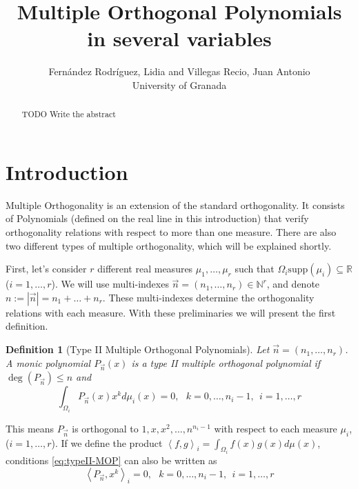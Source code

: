 \documentclass[12pt,a4]{article}
\theoremstyle{plain}
\newtheorem{definition}[theorem]{Definition}
\newcommand{\R}[0]{\mathbb{R}}
\newcommand{\N}[0]{\mathbb{N}}
\newcommand{\supp}[0]{\mathrm{supp}}
\newcommand{\cred}[1]{{\color{red} #1}}
\newcommand{\prodesc}[2]{\left\langle #1 , #2 \right\rangle}
\begin{document}
\title{Multiple Orthogonal Polynomials in several variables}


\author{Fernández Rodríguez, Lidia and Villegas Recio, Juan Antonio\\
\small University of Granada}
\maketitle

\begin{abstract}
\cred{TODO Write the abstract}
\end{abstract}

\section{Introduction}

Multiple Orthogonality is an extension of the standard orthogonality. It consists of Polynomials (defined on the real line in this introduction) that verify orthogonality relations with respect to more than one measure. There are also two different types of multiple orthogonality, which will be explained shortly.

First, let's consider $r$ different real measures $\mu_1,\dots,\mu_r$ such that $\Omega_i\supp(\mu_i)\subseteq\R$ ($i=1,\dots,r$). We will use multi-indexes $\vec n = (n_1, \dots,n_r)\in \N^r$, and denote $n:=|\vec n| = n_1 + \dots + n_r$. These multi-indexes determine the orthogonality relations with each measure. With these preliminaries we will present the first definition.

\begin{definition}[Type II Multiple Orthogonal Polynomials]
    Let $\vec n = (n_1,\dots,n_r)$. A monic polynomial $P_{\vec n}(x)$ is a type II multiple orthogonal polynomial if $\deg(P_{\vec n})\leq n$ and 
    \begin{equation}
        \label{eq:typeII-MOP}
        \int_{\Omega_i} P_{\vec n}(x) x^k d\mu_i(x) = 0, \ \ \ k=0,\dots,n_{i}-1, \ \ i = 1,\dots,r
    \end{equation}
\end{definition}

This means $P_{\vec n}$ is orthogonal to $1,x,x^2,\dots,n^{n_i-1}$ with respect to each measure $\mu_i$, ($i=1,\dots,r$). If we define the product $\prodesc{f}{g}_i=\int_{\Omega_i}f(x)g(x)d\mu(x)$, conditions \eqref{eq:typeII-MOP} can also be written as
\begin{equation}
    \label{eq:typeII-MOP-dot}
    \prodesc{P_{\vec n}}{x^k}_i = 0, \ \ \ k=0,\dots,n_{i}-1, \ \ i = 1,\dots,r
\end{equation}
\end{document}
